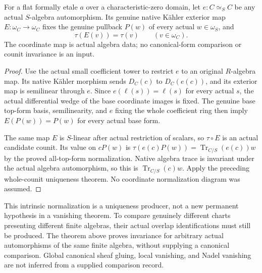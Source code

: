 \begin{theorem}
\label{thm:kn-nadel-coordinate-automorphism-counit}
\leanok
For a flat formally etale $a$ over a characteristic-zero domain, let
$e:C\simeq_S C$ be any actual $S$-algebra automorphism.  Its genuine
native K\"ahler exterior map $E:\omega_C\to\omega_C$ fixes the
genuine pullback $P(w)$ of every actual $w\in\omega_S$, and
\[
 \tau(E(v))=\tau(v)\qquad(v\in\omega_C).
\]
The coordinate map is actual algebra data; no canonical-form comparison
or counit invariance is an input.
\end{theorem}
\begin{proof}
Use the actual small coefficient tower to restrict $e$ to an original
$R$-algebra map.  Its native K\"ahler morphism sends $D_C(c)$ to
$D_C(e(c))$, and its exterior map is semilinear through $e$.  Since
$e(\ell(s))=\ell(s)$ for every actual $s$, the actual differential
wedge of the base coordinate images is fixed.  The genuine base
top-form basis, semilinearity, and $e$ fixing the whole coefficient
ring then imply $E(P(w))=P(w)$ for every actual base form.

The same map $E$ is $S$-linear after actual restriction of scalars,
so $\tau\circ E$ is an actual candidate counit.  Its value on
$cP(w)$ is $\tau(e(c)P(w))=\operatorname{Tr}_{C/S}(e(c))w$ by the
proved all-top-form normalization.  Native algebra trace is invariant
under the actual algebra automorphism, so this is
$\operatorname{Tr}_{C/S}(c)w$.  Apply the preceding whole-counit
uniqueness theorem.  No coordinate normalization diagram was assumed.
\end{proof}

This intrinsic normalization is a uniqueness producer, not a new
permanent hypothesis in a vanishing theorem.  To compare genuinely
different charts presenting different finite algebras, their actual
overlap identifications must still be produced.  The theorem above
proves invariance for arbitrary actual automorphisms of the same finite
algebra, without supplying a canonical comparison.  Global canonical
sheaf gluing, local vanishing, and
Nadel vanishing are not inferred from a supplied comparison record.
